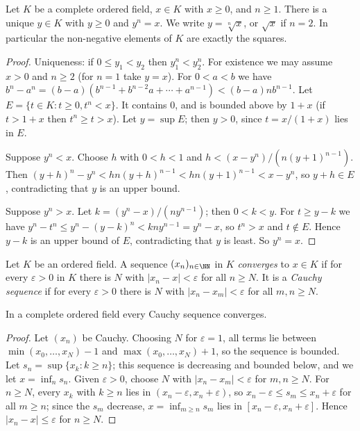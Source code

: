 \begin{proposition}\label{number-systems:proposition-roots}
Let $K$ be a complete ordered field, $x \in K$ with $x \geq 0$, and $n \geq 1$. There
is a unique $y \in K$ with $y \geq 0$ and $y^n = x$. We write $y = \sqrt[n]{x}$, or
$\sqrt{x}$ if $n = 2$. In particular the non-negative elements of $K$ are exactly
the squares.
\end{proposition}

\begin{proof}
Uniqueness: if $0 \leq y_1 < y_2$ then $y_1^n < y_2^n$. For existence we may assume
$x > 0$ and $n \geq 2$ (for $n = 1$ take $y = x$). For $0 < a < b$ we have
$b^n - a^n = (b - a)(b^{n-1} + b^{n-2}a + \cdots + a^{n-1}) < (b - a) n b^{n-1}$.
Let $E = \{t \in K : t \geq 0, t^n < x\}$. It contains $0$, and is bounded above
by $1 + x$ (if $t > 1 + x$ then $t^n \geq t > x$). Let $y = \sup E$; then $y > 0$,
since $t = x/(1 + x)$ lies in $E$.

Suppose $y^n < x$. Choose $h$ with $0 < h < 1$ and
$h < (x - y^n)/(n (y + 1)^{n-1})$. Then
$(y + h)^n - y^n < h n (y + h)^{n-1} < h n (y+1)^{n-1} < x - y^n$, so
$y + h \in E$, contradicting that $y$ is an upper bound.

Suppose $y^n > x$. Let $k = (y^n - x)/(n y^{n-1})$; then $0 < k < y$. For
$t \geq y - k$ we have $y^n - t^n \leq y^n - (y - k)^n < k n y^{n-1} = y^n - x$, so
$t^n > x$ and $t \notin E$. Hence $y - k$ is an upper bound of $E$, contradicting
that $y$ is least. So $y^n = x$.
\end{proof}

\begin{definition}\label{number-systems:definition-cauchy}
Let $K$ be an ordered field. A sequence $(x_n)_{n \in \NN}$ in $K$
\emph{converges} to $x \in K$ if for every $\varepsilon > 0$ in $K$ there is $N$
with $|x_n - x| < \varepsilon$ for all $n \geq N$. It is a \emph{Cauchy sequence}
if for every $\varepsilon > 0$ there is $N$ with $|x_n - x_m| < \varepsilon$ for
all $m, n \geq N$.
\end{definition}

\begin{proposition}\label{number-systems:proposition-cauchy-complete}
In a complete ordered field every Cauchy sequence converges.
\end{proposition}

\begin{proof}
Let $(x_n)$ be Cauchy. Choosing $N$ for $\varepsilon = 1$, all terms lie between
$\min(x_0, \ldots, x_N) - 1$ and $\max(x_0, \ldots, x_N) + 1$, so the sequence is
bounded. Let $s_n = \sup\{x_k : k \geq n\}$; this sequence is decreasing and
bounded below, and we let $x = \inf_n s_n$. Given $\varepsilon > 0$, choose $N$
with $|x_n - x_m| < \varepsilon$ for $m, n \geq N$. For $n \geq N$, every
$x_k$ with $k \geq n$ lies in $(x_n - \varepsilon, x_n + \varepsilon)$, so
$x_n - \varepsilon \leq s_m \leq x_n + \varepsilon$ for all $m \geq n$; since the
$s_m$ decrease, $x = \inf_{m \geq n} s_m$ lies in
$[x_n - \varepsilon, x_n + \varepsilon]$. Hence $|x_n - x| \leq \varepsilon$ for
$n \geq N$.
\end{proof}

